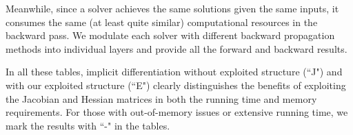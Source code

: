 Meanwhile, since a solver achieves the same solutions given the same inputs, it consumes the same (at least quite similar) computational resources in the backward pass.
We modulate each solver with different backward propagation methods into individual layers and provide all the forward and backward results.

In all these tables, implicit differentiation without exploited structure (``J") and with our exploited structure (``E") clearly distinguishes the benefits of exploiting the Jacobian and Hessian matrices in both the running time and memory requirements.
For those with out-of-memory issues or extensive running time, we mark the results with ``-" in the tables.

\begin{table}[!ht]
\centering
\small
\caption{\textit{Implicit eigen decomposition (IED) layer, CPU time (s) for symmetric $\mb{A}$.
``AutoDiff": PyTorch \texttt{eigh}() function;
``DDN": deep declarative network;
``IFT": implicit function theorem;
``unroll": unrolling the forward iteration for gradients via PyTorch autodiff mechanism;
``J": autodiff Jacobian without exploited structure;
``E": our implicit differentiation with exploited structure.
Our \colorbox{gray!50}{best suggestions} are highlighted considering the overall solution precision and computational requirements.}
}
\label{tb:ied_symmetric_time_cpu}
\setlength{\tabcolsep}{11pt}
\end{table}

